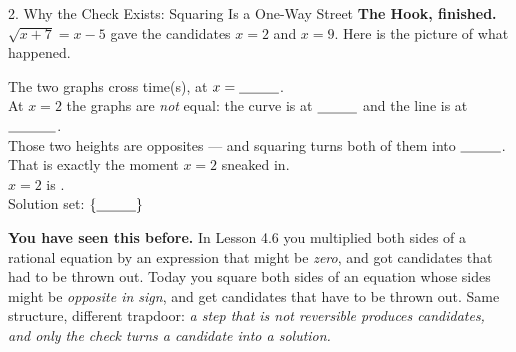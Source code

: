 \documentclass[10pt]{article}
\newcommand{\lgrid}[4]{%
  \draw[step=1, linegray!40, very thin] (#1,#3) grid (#2,#4);
  \draw[->, semithick, charcoal] (#1,0)--(#2,0) node[below right, font=\scriptsize]{$x$};
  \draw[->, semithick, charcoal] (0,#3)--(0,#4) node[left, font=\scriptsize]{$y$};}
\begin{document}
\begin{notesbox}{2. Why the Check Exists: Squaring Is a One-Way Street}
\vspace{4pt}
\textbf{The Hook, finished.} $\sqrt{x+7}=x-5$ gave the candidates $x=2$ and $x=9$. Here is the
picture of what happened.
\begin{center}
\begin{minipage}[c]{0.48\linewidth}
\centering
{}
\end{minipage}
\hfill
\begin{minipage}[c]{0.48\linewidth}
\small
The two graphs cross \blank{1.4cm} time(s), at $x=\blank{1.0cm}$. \\[4pt]
At $x=2$ the graphs are \emph{not} equal: the curve is at $\blank{1.0cm}$ and the line is at
$\blank{1.2cm}$. \\[5pt]
Those two heights are opposites --- and squaring turns both of them into
$\blank{1.0cm}$. That is exactly the moment $x=2$ sneaked in. \\[5pt]
$x=2$ is \blank{2.6cm}. \\[4pt]
Solution set: $\{\blank{1.0cm}\}$
\end{minipage}
\end{center}
\vspace{2pt}
\begin{center}
\begin{tcolorbox}[colback=redbg, colframe=redacc, boxrule=0.7pt, arc=1.5mm, width=0.94\linewidth,
    left=3mm, right=3mm, top=1.5mm, bottom=1.5mm]
\small \textbf{You have seen this before.} In Lesson 4.6 you multiplied both sides of a rational
equation by an expression that might be \emph{zero}, and got candidates that had to be thrown out.
Today you square both sides of an equation whose sides might be \emph{opposite in sign}, and get
candidates that have to be thrown out. Same structure, different trapdoor: \emph{a step that is not
reversible produces candidates, and only the check turns a candidate into a solution.}
\end{tcolorbox}
\end{center}
\end{notesbox}
\end{document}

